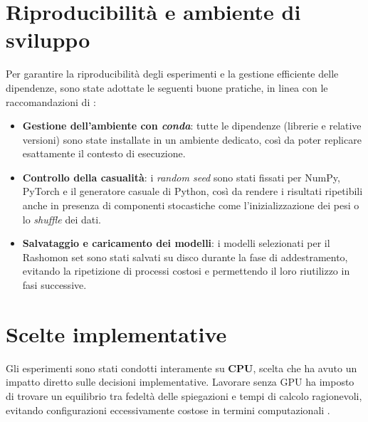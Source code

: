 \documentclass[12pt,a4paper,oneside]{report}
\numberwithin{figure}{chapter}
\numberwithin{table}{chapter}
\begin{document}
\section{Riproducibilità e ambiente di sviluppo}
Per garantire la riproducibilità degli esperimenti e la gestione efficiente
delle dipendenze, sono state adottate le seguenti buone pratiche, in linea con
le raccomandazioni di \citet{pineau2020improving}:

\begin{itemize}
      \item \textbf{Gestione dell’ambiente con \emph{conda}}: tutte le dipendenze (librerie e relative versioni) sono state installate in un ambiente dedicato, così da poter replicare esattamente il contesto di esecuzione.
      \item \textbf{Controllo della casualità}: i \emph{random seed} sono stati fissati per NumPy, PyTorch e il generatore casuale di Python, così da rendere i risultati ripetibili anche in presenza di componenti stocastiche come l’inizializzazione dei pesi o lo \emph{shuffle} dei dati.
      \item \textbf{Salvataggio e caricamento dei modelli}: i modelli selezionati per il Rashomon set sono stati salvati su disco durante la fase di addestramento, evitando la ripetizione di processi costosi e permettendo il loro riutilizzo in fasi successive.
\end{itemize}

\section{Scelte implementative}
\label{sec:scelte_implementative}

Gli esperimenti sono stati condotti interamente su \textbf{CPU}, scelta che ha
avuto un impatto diretto sulle decisioni implementative. Lavorare senza GPU ha
imposto di trovare un equilibrio tra fedeltà delle spiegazioni e tempi di
calcolo ragionevoli, evitando configurazioni eccessivamente costose in termini
computazionali \citep{leventi2023consistency}.
\end{document}
